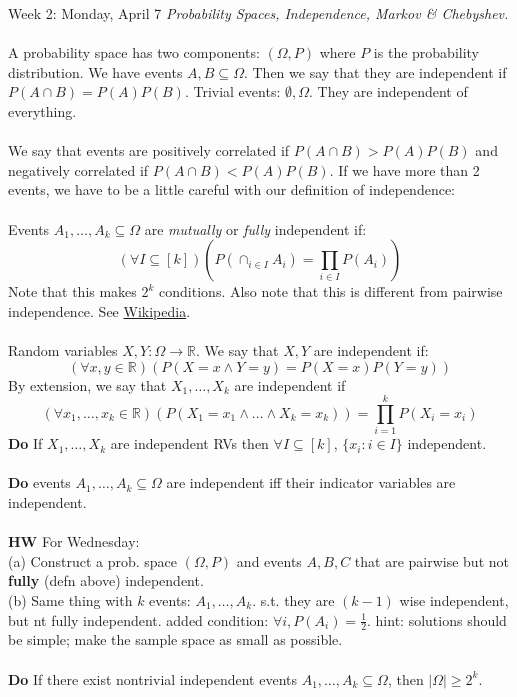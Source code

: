 \documentclass[12pt]{article}
\theoremstyle{remark}
\newcommand{\R}{\mathbb{R}}
\begin{document}
\label{4}\begin{section} 
{Week 2: Monday, April 7}
\indent\textit{Probability Spaces, Independence, Markov \& Chebyshev.}\\\\
A probability space has two components: $(\Omega,P)$ where $P$ is the probability distribution. We have events $A,B \subseteq \Omega$. Then we say that they are independent if $P(A\cap B) = P(A)P(B)$. Trivial events: $\emptyset,\Omega$. They are independent of everything.
\\\\We say that events are positively correlated if $P(A\cap B) > P(A)P(B)$ and negatively correlated if $P(A\cap B) < P(A)P(B)$. If we have more than 2 events, we have to be a little careful with our definition of independence:
\\\\
Events $A_1,\ldots,A_k \subseteq \Omega$ are \textit{mutually }or \textit{fully} independent if:
$$(\forall I \subseteq [k])(P(\cap_{i \in I} A_i) = \prod_{i \in I} P(A_i))$$ Note that this makes $2^k$ conditions. Also note that this is different from pairwise independence. See \href{http://en.wikipedia.org/wiki/Independence\_\%28probability\_theory\%29\#More_than_two_events}{Wikipedia}.
\\\\Random variables $X,Y: \Omega \to \R$. We say that $X,Y$ are independent if:
 $$(\forall x,y \in \R)(P(X=x \land Y=y)=P(X=x)P(Y=y))$$
By extension, we say that $X_1,\ldots,X_k$ are independent if $$(\forall x_1,\ldots,x_k \in \R)(P(X_1 = x_1 \land \ldots \land X_k = x_k)) = \prod_{i = 1}^{k} P(X_i = x_i)$$
\textbf{Do} If $X_1,\ldots,X_k$ are independent RVs then $\forall I \subseteq [k]$, $\{x_i : i \in I\}$ independent.
\\\\\textbf{Do} events $A_1,\ldots,A_k \subseteq \Omega$ are independent iff their indicator variables are independent.
\\\\\textbf{HW} For Wednesday: 
\\(a) Construct a prob. space $(\Omega,P)$ and events $A,B,C$ that are pairwise but not \textbf{fully} (defn above) independent.
\\(b) Same thing with $k$ events: $A_1,\ldots,A_k$. s.t. they are $(k-1)$ wise independent, but nt fully independent. added condition: $\forall i, P(A_i) = \frac12$. hint: solutions should be simple; make the sample space as small as possible.
\\\\\textbf{Do} If there exist nontrivial independent events $A_1,\ldots,A_k \subseteq \Omega$, then $|\Omega| \geq 2^k$. 

\end{section}
\end{document}

